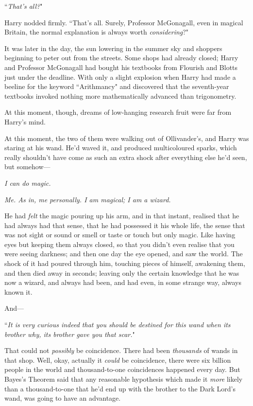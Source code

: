 ``\emph{That's all?}"

Harry nodded firmly. ``That's all. Surely, Professor McGonagall, even in magical Britain, the normal explanation is always worth \emph{considering}?"

\later

It was later in the day, the sun lowering in the summer sky and shoppers beginning to peter out from the streets. Some shops had already closed; Harry and Professor McGonagall had bought his textbooks from Flourish and Blotts just under the deadline. With only a slight explosion when Harry had made a beeline for the keyword ``Arithmancy" and discovered that the seventh-year textbooks invoked nothing more mathematically advanced than trigonometry.

At this moment, though, dreams of low-hanging research fruit were far from Harry's mind.

At this moment, the two of them were walking out of Ollivander's, and Harry was staring at his wand. He'd waved it, and produced multicoloured sparks, which really shouldn't have come as such an extra shock after everything else he'd seen, but somehow—

\emph{I can do magic.}

\emph{Me. As in, me personally. I am magical; I am a wizard.}

He had \emph{felt} the magic pouring up his arm, and in that instant, realised that he had always had that sense, that he had possessed it his whole life, the sense that was not sight or sound or smell or taste or touch but only magic. Like having eyes but keeping them always closed, so that you didn't even realise that you were seeing darkness; and then one day the eye opened, and saw the world. The shock of it had poured through him, touching pieces of himself, awakening them, and then died away in seconds; leaving only the certain knowledge that he was now a wizard, and always had been, and had even, in some strange way, always known it.

And—

``\emph{It is very curious indeed that you should be destined for this wand when its brother why, its brother gave you that scar.}"

That could not \emph{possibly} be coincidence. There had been \emph{thousands} of wands in that shop. Well, okay, actually it \emph{could} be coincidence, there were six billion people in the world and thousand-to-one coincidences happened every day. But Bayes's Theorem said that any reasonable hypothesis which made it \emph{more} likely than a thousand-to-one that he'd end up with the brother to the Dark Lord's wand, was going to have an advantage.

